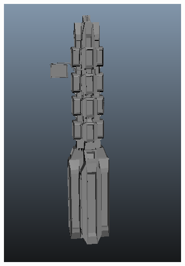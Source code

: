 \documentclass[11pt,a4paper]{article}
\begin{document}
\begin{figure}[!htbp]
\begin{minipage}[b]{0.2\textwidth}
        \includegraphics[scale=0.2]{logos/file7.png}
  \end{minipage}
\end{figure}
\begin{center}
\end{center}
\end{document}
